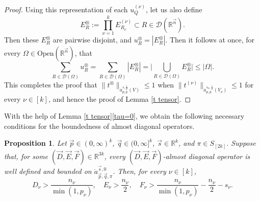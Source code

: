 \documentclass[11pt, reqno]{amsart}
\newtheorem{proposition}[theorem]{Proposition}
\theoremstyle{definition}
\theoremstyle{remark}
\numberwithin{equation}{section}
\newcommand{\D}{\mathscr D}
\newcommand{\vD}{\vec D}
\newcommand{\vE}{\vec E}
\newcommand{\vF}{\vec F}
\newcommand{\R}{\mathbb R}
\newcommand{\vn}{\vec n}
\newcommand{\vp}{\vec p}
\newcommand{\vq}{\vec q}
\newcommand{\vs}{\vec s}
\newcommand{\asn}{\dot a^{\vs,0}_{\vp,\vq,\pi}}
\newcommand{\abs}[1]{|#1|}
\newcommand{\Babs}[1]{\Big|#1\Big|}
\newcommand{\Norm}[2]{\|#1\|_{#2}}
\newcommand{\Open}{\mathrm{Open}}
\begin{document}
\begin{proof}
Using this representation of each $u_Q^{(\nu)}$, let us also define
\begin{equation*}
E_R^{\otimes}:=\prod_{\nu=1}^k E_{R_\nu}^{(\nu)}\subset R\in\D(\R^{\vn}).
\end{equation*}
Then these $E_R^{\otimes}$ are pairwise disjoint, and $u^{\otimes}_R=\abs{E^{\otimes}_R}$. Then it follows at once, for every $\Omega\in\Open(\R^{\vn})$, that
\begin{equation*}
\sum_{R\in\D(\Omega)}u^{\otimes}_R
=\sum_{R\in\D(\Omega)}\abs{E^{\otimes}_R}
=\Babs{\bigcup_{R\in\D(\Omega)}E^{\otimes}_R}
\leq\abs{\Omega}.
\end{equation*}
This completes the proof that $\Norm{t^{\otimes}}{\dot a^{s,\frac{1}{p}}_{p,p}(V)}\leq 1$ when $\Norm{t^{(\nu)}}{\dot a^{s_\nu,\frac{1}{p}}_{p,p}(V_\nu)}\leq 1$ for every $\nu\in[k]$, and hence the proof of Lemma \ref{t tensor}.
\end{proof}

With the help of Lemma \ref{t tensor}\eqref{tau=0}, we obtain the following necessary conditions for the boundedness of almost diagonal operators.


\begin{proposition}\label{sharpness of AD}
Let $\vp\in(0,\infty)^k$, $\vq\in(0,\infty]^k$, $\vs\in\R^k$, and $\pi\in S_{[2k]}$.
Suppose that, for some $(\vD,\vE,\vF)\in\R^{3k}$, every $(\vD,\vE,\vF)$-almost diagonal operator is well defined and bounded on $\asn$.
Then, for every $\nu\in[k]$,
\begin{equation}\label{DiEiFiNec}
D_\nu>\frac{n_\nu}{\min(1,p_\nu)},\quad
E_\nu>\frac{n_\nu}{2},\quad
F_\nu>\frac{n_\nu}{\min(1,p_\nu)}-\frac{n_\nu}{2}-s_\nu.
\end{equation}
\end{proposition}
\end{document}
